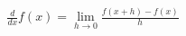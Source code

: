 \documentclass[preview]{standalone}
\begin{document}
\begin{align*}
\frac{d}{dx} f(x) = \lim_{h \to 0} \frac{f(x+h) - f(x)}{h}
\end{align*}
\end{document}
